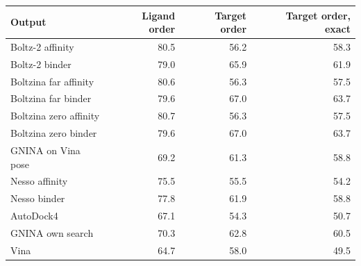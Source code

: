 \begin{tabular}{lrrr}
\toprule
Output & Ligand order & Target order & Target order, exact \\
\midrule
Boltz-2 affinity & 80.5 & 56.2 & 58.3 \\
Boltz-2 binder & 79.0 & 65.9 & 61.9 \\
Boltzina far affinity & 80.6 & 56.3 & 57.5 \\
Boltzina far binder & 79.6 & 67.0 & 63.7 \\
Boltzina zero affinity & 80.7 & 56.3 & 57.5 \\
Boltzina zero binder & 79.6 & 67.0 & 63.7 \\
GNINA on Vina pose & 69.2 & 61.3 & 58.8 \\
Nesso affinity & 75.5 & 55.5 & 54.2 \\
Nesso binder & 77.8 & 61.9 & 58.8 \\
AutoDock4 & 67.1 & 54.3 & 50.7 \\
GNINA own search & 70.3 & 62.8 & 60.5 \\
Vina & 64.7 & 58.0 & 49.5 \\
\bottomrule
\end{tabular}
